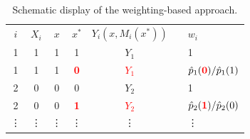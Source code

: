 \documentclass[nojss]{jss}
\begin{document}
\begin{table}[h]
\centering
\begin{tabular}{ccccccl}
\cmidrule[\heavyrulewidth](){1-5}
$i$& $X_i$ & $x$ & $x^*$ & $Y_i(x,M_i(x^*))$ & & $w_i$\\
\cmidrule(){1-5}
1 & 1 & 1 & 1 & $Y_1$ & & 1 \\
\rowcolor[gray]{.9}
1 & 1 & 1 & \textcolor{red}{\bf 0} & \textcolor{red}{$Y_1$} & \cellcolor{white} & \cellcolor{white}$\hat p_1(\textcolor{red}{\bf 0})/\hat p_1(1)$\\
2 & 0 & 0 & 0 & $Y_2$ & & 1\\
\rowcolor[gray]{.9}
2 & 0 & 0 & \textcolor{red}{\bf 1} & \textcolor{red}{$Y_2$} & \cellcolor{white} & \cellcolor{white}$\hat p_2(\textcolor{red}{\bf 1})/\hat p_2(0)$\\
\vdots & \vdots & \vdots & \vdots & \vdots & & \vdots \\
\cmidrule[\heavyrulewidth](){1-5}
\end{tabular}
\caption{Schematic display of the weighting-based approach.}\label{tab-exp2}
\end{table}
\end{document}
